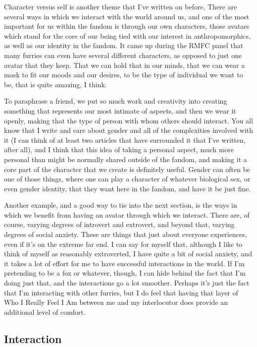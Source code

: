 Character versus self is another theme that I've written on before.  There are several ways in which we interact with the world around us, and one of the most important for us within the fandom is through our own characters, those avatars which stand for the core of our being tied with our interest in anthropomorphics, as well as our identity in the fandom.  It came up during the RMFC panel that many furries can even have several different characters, as opposed to just one avatar that they keep.  That we can hold that in our minds, that we can wear a mask to fit our moods and our desires, to be the type of individual we want to be, that is quite amazing, I think.

To paraphrase a friend, we put so much work and creativity into creating something that represents our most intimate of aspects, and then we wear it openly, making that the type of person with whom others should interact.  You all know that I write and care about gender and all of the complexities involved with it (I can think of at least two articles that have surrounded it that I've written, after all), and I think that this idea of taking a personal aspect, much more personal than might be normally shared outside of the fandom, and making it a core part of the character that we create is definitely useful.  Gender can often be one of those things, where one can play a character of whatever biological sex, or even gender identity, that they want here in the fandom, and have it be just fine.

Another example, and a good way to tie into the next section, is the ways in which we benefit from having an avatar through which we interact.  There are, of course, varying degrees of introvert and extrovert, and beyond that, varying degrees of social anxiety.  These are things that just about everyone experiences, even if it's on the extreme far end. I can say for myself that, although I like to think of myself as reasonably extroverted, I have quite a bit of social anxiety, and it takes a lot of effort for me to have successful interactions in the world.  If I'm pretending to be a fox or whatever, though, I can hide behind the fact that I'm doing just that, and the interactions go a lot smoother.  Perhaps it's just the fact that I'm interacting with other furries, but I do feel that having that layer of Who I Really Feel I Am between me and my interlocutor does provide an additional level of comfort.

\subsection*{Interaction}


